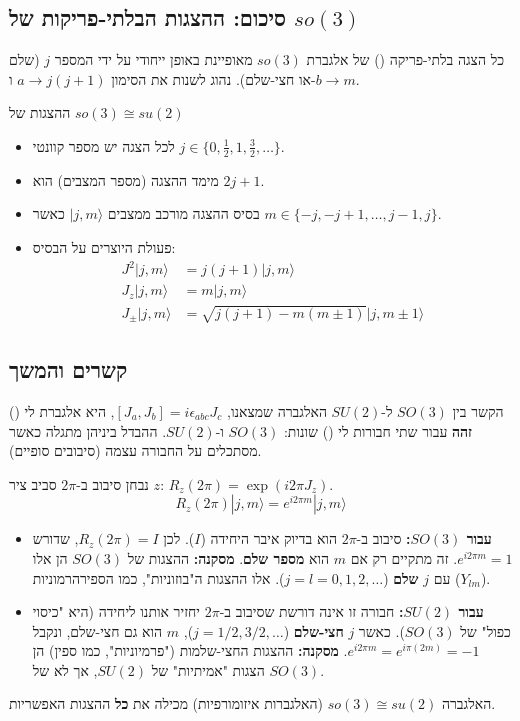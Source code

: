 \subsection*{סיכום: ההצגות הבלתי-פריקות של $so(3)$}
כל הצגה בלתי-פריקה () של אלגברת $so(3)$ מאופיינת באופן ייחודי על ידי המספר $j$ (שלם או חצי-שלם).
נהוג לשנות את הסימון $a \to j(j+1)$ ו-$b \to m$.

\begin{formulabox}{ההצגות של $so(3) \cong su(2)$}
\begin{itemize}
    \item לכל הצגה יש מספר קוונטי $j \in \{0, \frac{1}{2}, 1, \frac{3}{2}, \dots \}$.
    \item מימד ההצגה (מספר המצבים) הוא $2j+1$.
    \item בסיס ההצגה מורכב ממצבים $|j, m\rangle$ כאשר $m \in \{-j, -j+1, \dots, j-1, j\}$.
    \item פעולת היוצרים על הבסיס:
    \begin{align*}
        J^2 |j, m\rangle &= j(j+1) |j, m\rangle \\
        J_z |j, m\rangle &= m |j, m\rangle \\
        J_{\pm} |j, m\rangle &= \sqrt{j(j+1) - m(m\pm 1)} |j, m \pm 1\rangle
    \end{align*}
\end{itemize}
\end{formulabox}

\subsection*{קשרים והמשך}

\begin{summarybox}{הקשר בין $SO(3)$ ל-$SU(2)$}
האלגברה שמצאנו, $[J_a, J_b] = i \epsilon_{abc} J_c$, היא אלגברת לי () \textbf{זהה} עבור שתי חבורות לי () שונות: $SO(3)$ ו-$SU(2)$.
ההבדל ביניהן מתגלה כאשר מסתכלים על החבורה עצמה (סיבובים סופיים).

נבחן סיבוב ב-$2\pi$ סביב ציר $z$: $R_z(2\pi) = \exp(i 2\pi J_z)$.
$$ R_z(2\pi) |j, m\rangle = e^{i 2\pi m} |j, m\rangle $$
\begin{itemize}
    \item \textbf{עבור $SO(3)$:} סיבוב ב-$2\pi$ הוא בדיוק איבר היחידה ($I$). לכן $R_z(2\pi) = I$, שדורש $e^{i 2\pi m} = 1$. זה מתקיים רק אם $m$ הוא \textbf{מספר שלם}.
    \textbf{מסקנה:} ההצגות של $SO(3)$ הן אלו עם $j$ \textbf{שלם} ($j=l=0, 1, 2, \dots$). אלו ההצגות ה"בוזוניות", כמו הספירהרמוניות ($Y_{lm}$).
    
    \item \textbf{עבור $SU(2)$:} חבורה זו אינה דורשת שסיבוב ב-$2\pi$ יחזיר אותנו ליחידה (היא "כיסוי כפול" של $SO(3)$).
    כאשר $j$ \textbf{חצי-שלם} ($j=1/2, 3/2, \dots$), $m$ הוא גם חצי-שלם, ונקבל $e^{i 2\pi m} = e^{i \pi (2m)} = -1$.
    \textbf{מסקנה:} ההצגות החצי-שלמות ("פרמיוניות", כמו ספין) הן הצגות "אמיתיות" של $SU(2)$, אך לא של $SO(3)$.
\end{itemize}
האלגברה $so(3) \cong su(2)$ (האלגברות איזומורפיות) מכילה את \textbf{כל} ההצגות האפשריות.
\end{summarybox}

